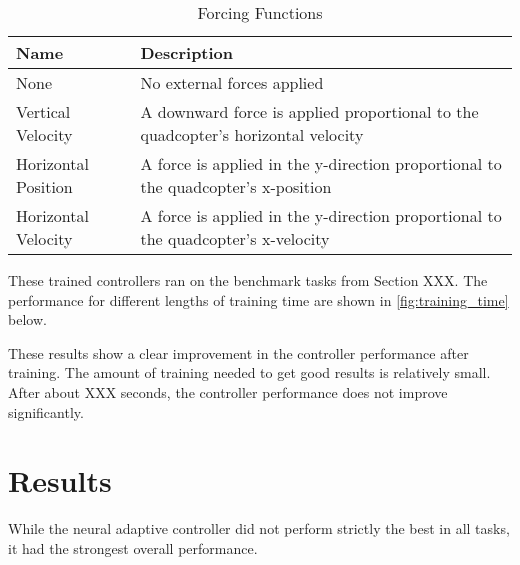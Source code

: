 \documentclass[letterpaper,12pt,titlepage,oneside,final]{book}
\begin{document}
\begin{table}
\caption{Forcing Functions} \label{table:forcingfunctions}
\begin{center}
\begin{tabular}{| l | p{9cm} |}
\hline
\textbf{Name} & \textbf{Description} \\ \hline
None & No external forces applied \\ \hline
Vertical Velocity & A downward force is applied proportional to the quadcopter's horizontal velocity \\ \hline
Horizontal Position & A force is applied in the y-direction proportional to the quadcopter's x-position \\ \hline
Horizontal Velocity & A force is applied in the y-direction proportional to the quadcopter's x-velocity \\ \hline
\end{tabular}
\end{center}
\end{table}

These trained controllers ran on the benchmark tasks from Section XXX.
The performance for different lengths of training time are shown in \autoref{fig:training_time} below.

\begin{figure} \label{fig:training_time}

\end{figure}

These results show a clear improvement in the controller performance after training.
The amount of training needed to get good results is relatively small. 
After about XXX seconds, the controller performance does not improve significantly.



\section{Results}


While the neural adaptive controller did not perform strictly the best in all tasks, it had the strongest overall performance.
 
\end{document}
